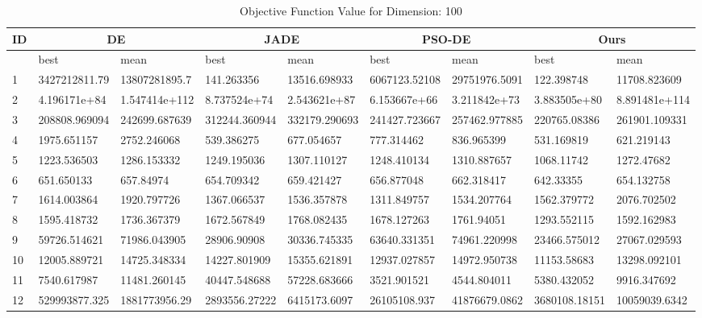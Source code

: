\begin{table}
\centering
\caption{Objective Function Value for Dimension: 100}
 \begin{tabular}{|p{0.8cm}|p{1.6cm}|p{1.6cm}|p{1.6cm}|p{1.6cm}|p{1.6cm}|p{1.6cm}|p{1.6cm}|p{1.6cm}|} 
\hline
 ID & \multicolumn{2}{c|}{DE} & \multicolumn{2}{c|}{JADE} & \multicolumn{2}{c|}{PSO-DE} & \multicolumn{2}{c|}{Ours} \\
 \hline
    & best & mean & best & mean & best & mean & best & mean \\ [0.5ex] 
 \hline
1  & 3427212811.79 & 13807281895.7 & 141.263356 & 13516.698933 & 6067123.52108 & 29751976.5091 & 122.398748 & 11708.823609 \\ 
 \hline
2  & 4.196171e+84 & 1.547414e+112 & 8.737524e+74 & 2.543621e+87 & 6.153667e+66 & 3.211842e+73 & 3.883505e+80 & 8.891481e+114 \\ 
 \hline
3  & 208808.969094 & 242699.687639 & 312244.360944 & 332179.290693 & 241427.723667 & 257462.977885 & 220765.08386 & 261901.109331 \\ 
 \hline
4  & 1975.651157 & 2752.246068 & 539.386275 & 677.054657 & 777.314462 & 836.965399 & 531.169819 & 621.219143 \\ 
 \hline
5  & 1223.536503 & 1286.153332 & 1249.195036 & 1307.110127 & 1248.410134 & 1310.887657 & 1068.11742 & 1272.47682 \\ 
 \hline
6  & 651.650133 & 657.84974 & 654.709342 & 659.421427 & 656.877048 & 662.318417 & 642.33355 & 654.132758 \\ 
 \hline
7  & 1614.003864 & 1920.797726 & 1367.066537 & 1536.357878 & 1311.849757 & 1534.207764 & 1562.379772 & 2076.702502 \\ 
 \hline
8  & 1595.418732 & 1736.367379 & 1672.567849 & 1768.082435 & 1678.127263 & 1761.94051 & 1293.552115 & 1592.162983 \\ 
 \hline
9  & 59726.514621 & 71986.043905 & 28906.90908 & 30336.745335 & 63640.331351 & 74961.220998 & 23466.575012 & 27067.029593 \\ 
 \hline
10  & 12005.889721 & 14725.348334 & 14227.801909 & 15355.621891 & 12937.027857 & 14972.950738 & 11153.58683 & 13298.092101 \\ 
 \hline
11  & 7540.617987 & 11481.260145 & 40447.548688 & 57228.683666 & 3521.901521 & 4544.804011 & 5380.432052 & 9916.347692 \\ 
 \hline
12  & 529993877.325 & 1881773956.29 & 2893556.27222 & 6415173.6097 & 26105108.937 & 41876679.0862 & 3680108.18151 & 10059039.6342 \\ 
 \hline

\end{tabular}
\end{table}
